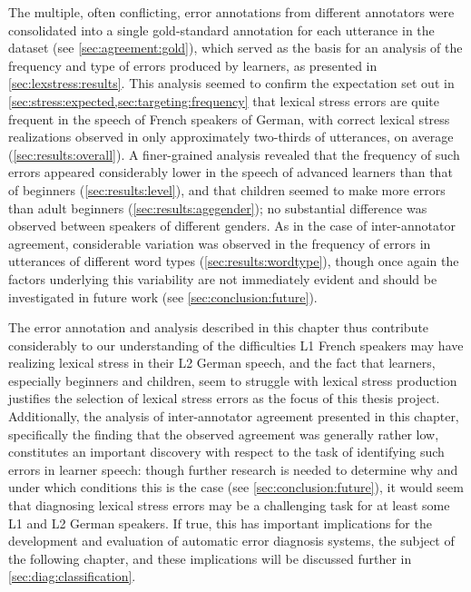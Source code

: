 	The multiple, often conflicting, error annotations from different annotators were consolidated into a single gold-standard annotation for each utterance in the dataset (see \cref{sec:agreement:gold}), which served as the basis for an analysis of the frequency and type of errors produced by learners, as presented in \cref{sec:lexstress:results}. This analysis seemed to confirm the expectation set out in \cref{sec:stress:expected,sec:targeting:frequency} that lexical stress errors are quite frequent in the speech of French speakers of German, with correct lexical stress realizations observed in only approximately two-thirds of utterances, on average (\cref{sec:results:overall}). A finer-grained analysis revealed that the frequency of such errors appeared considerably lower in the speech of advanced learners than that of beginners (\cref{sec:results:level}), and that children seemed to make more errors than adult beginners (\cref{sec:results:agegender}); no substantial difference was observed between speakers of different genders.  As in the case of inter-annotator agreement, considerable variation was observed in the frequency of errors in utterances of different word types (\cref{sec:results:wordtype}), though once again the factors underlying this variability are not immediately evident and should be investigated in future work (see \cref{sec:conclusion:future}).
	
	
	The error annotation and analysis described in this chapter thus contribute considerably to our understanding of the difficulties L1 French speakers may have realizing lexical stress in their L2 German speech, and the fact that learners, especially beginners and children, seem to struggle with lexical stress production justifies the selection of lexical stress errors as the focus of this thesis project. Additionally, the analysis of inter-annotator agreement presented in this chapter, specifically the finding that the observed agreement was generally rather low,
	constitutes an important discovery with respect to the task of identifying such errors in learner speech:
	though further research is needed to determine why and under which conditions this is the case (see \cref{sec:conclusion:future}), it would seem that diagnosing lexical stress errors may be a challenging task for at least some L1 and L2 German speakers. If true, this has important implications for the development and evaluation of automatic error diagnosis systems, the subject of the following chapter, and these implications will be discussed further in \cref{sec:diag:classification}.
	